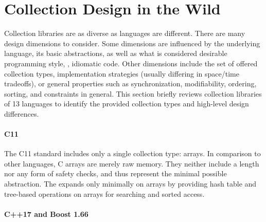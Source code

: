 \documentclass[sigconf, 10pt]{acmart}
\begin{document}
\section{Collection Design in the Wild}
\label{sec:col-wild}


Collection libraries are as diverse as languages are different.
There are many design dimensions to consider.
Some dimensions are influenced by the underlying language,
its basic abstractions,
as well as what is considered desirable programming style, \ie, idiomatic code.
Other dimensions include the set of offered collection types,
implementation strategies (usually differing in space/time tradeoffs),
or general properties such as synchronization, modifiability, ordering,
sorting, and constraints in general.
%
This section briefly reviews collection libraries of 13 languages
to identify the provided collection types
and high-level design differences.

\paragraph{C11}


The C11 standard includes only a single collection type: arrays.
In comparison to other languages, C arrays are merely raw memory.
They neither include a length nor any form of safety checks,
and thus represent the minimal possible abstraction.
The 
expands only minimally on arrays
by providing hash table and tree-based operations on arrays
for searching and sorted access.

\paragraph{C++17 and Boost 1.66}

% 
% 
\end{document}
